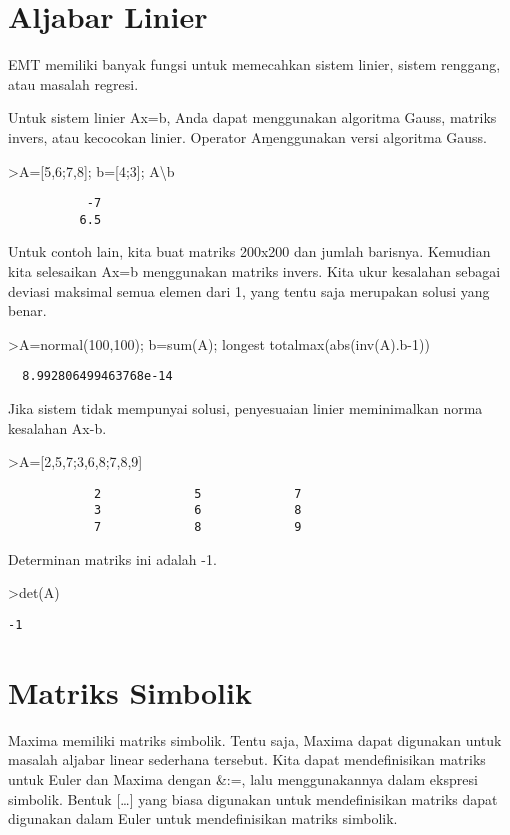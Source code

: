 \documentclass[
]{book}
\begin{document}
\chapter{Aljabar Linier}\label{aljabar-linier}

EMT memiliki banyak fungsi untuk memecahkan sistem linier, sistem renggang, atau masalah regresi.

Untuk sistem linier Ax=b, Anda dapat menggunakan algoritma Gauss, matriks invers, atau kecocokan linier. Operator A\b menggunakan versi algoritma Gauss.

\textgreater A={[}5,6;7,8{]}; b={[}4;3{]}; A\textbackslash b

\begin{verbatim}
           -7 
          6.5 
\end{verbatim}

Untuk contoh lain, kita buat matriks 200x200 dan jumlah barisnya. Kemudian kita selesaikan Ax=b menggunakan matriks invers. Kita ukur kesalahan sebagai deviasi maksimal semua elemen dari 1, yang tentu saja merupakan solusi yang benar.

\textgreater A=normal(100,100); b=sum(A); longest totalmax(abs(inv(A).b-1))

\begin{verbatim}
  8.992806499463768e-14 
\end{verbatim}

Jika sistem tidak mempunyai solusi, penyesuaian linier meminimalkan norma kesalahan Ax-b.

\textgreater A={[}2,5,7;3,6,8;7,8,9{]}

\begin{verbatim}
            2             5             7 
            3             6             8 
            7             8             9 
\end{verbatim}

Determinan matriks ini adalah -1.

\textgreater det(A)

\begin{verbatim}
-1
\end{verbatim}

\chapter{Matriks Simbolik}\label{matriks-simbolik}

Maxima memiliki matriks simbolik. Tentu saja, Maxima dapat digunakan untuk masalah aljabar linear sederhana tersebut. Kita dapat mendefinisikan matriks untuk Euler dan Maxima dengan \&:=, lalu menggunakannya dalam ekspresi simbolik. Bentuk {[}\ldots{]} yang biasa digunakan untuk mendefinisikan matriks dapat digunakan dalam Euler untuk mendefinisikan matriks simbolik.
\end{document}

